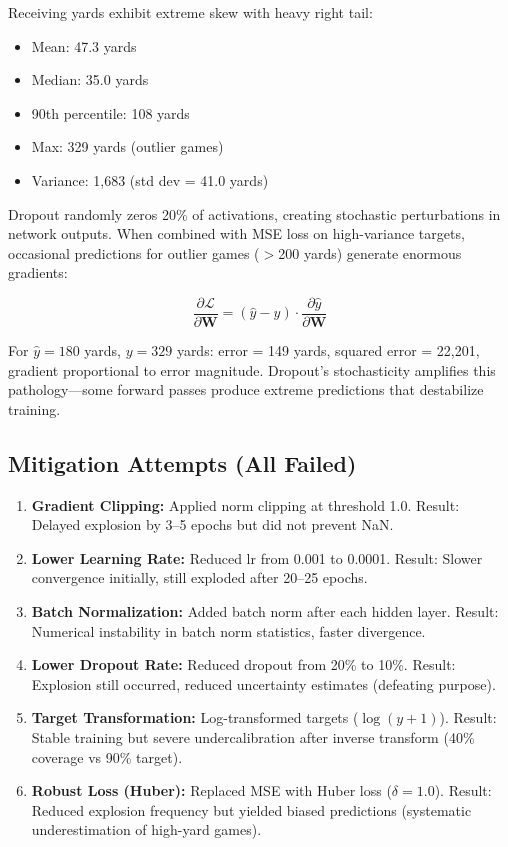 Receiving yards exhibit extreme skew with heavy right tail:

\begin{itemize}
  \item Mean: 47.3 yards
  \item Median: 35.0 yards
  \item 90th percentile: 108 yards
  \item Max: 329 yards (outlier games)
  \item Variance: 1,683 (std dev = 41.0 yards)
\end{itemize}

Dropout randomly zeros 20\% of activations, creating stochastic perturbations in network outputs. When combined with MSE loss on high-variance targets, occasional predictions for outlier games ($>$200 yards) generate enormous gradients:

\begin{equation}
\frac{\partial \mathcal{L}}{\partial \mathbf{W}} = (\hat{y} - y) \cdot \frac{\partial \hat{y}}{\partial \mathbf{W}}
\end{equation}

For $\hat{y} = 180$ yards, $y = 329$ yards: error = 149 yards, squared error = 22,201, gradient proportional to error magnitude. Dropout's stochasticity amplifies this pathology—some forward passes produce extreme predictions that destabilize training.

\subsection{Mitigation Attempts (All Failed)}

\begin{enumerate}
  \item \textbf{Gradient Clipping:} Applied norm clipping at threshold 1.0. Result: Delayed explosion by 3--5 epochs but did not prevent NaN.

  \item \textbf{Lower Learning Rate:} Reduced lr from 0.001 to 0.0001. Result: Slower convergence initially, still exploded after 20--25 epochs.

  \item \textbf{Batch Normalization:} Added batch norm after each hidden layer. Result: Numerical instability in batch norm statistics, faster divergence.

  \item \textbf{Lower Dropout Rate:} Reduced dropout from 20\% to 10\%. Result: Explosion still occurred, reduced uncertainty estimates (defeating purpose).

  \item \textbf{Target Transformation:} Log-transformed targets ($\log(y + 1)$). Result: Stable training but severe undercalibration after inverse transform (40\% coverage vs 90\% target).

  \item \textbf{Robust Loss (Huber):} Replaced MSE with Huber loss ($\delta=1.0$). Result: Reduced explosion frequency but yielded biased predictions (systematic underestimation of high-yard games).
\end{enumerate}

